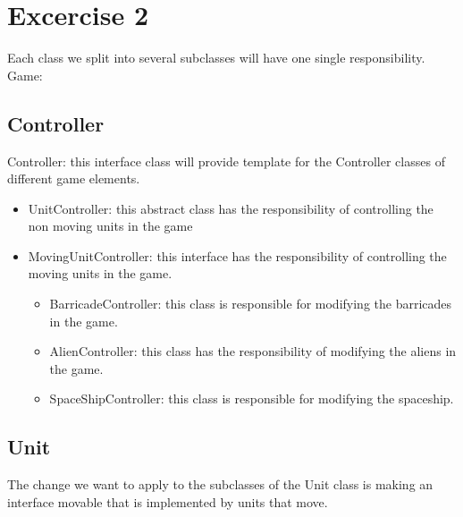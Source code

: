 \documentclass[10pt]{article}
\begin{document}
\section*{Excercise 2}
Each class we split into several subclasses will have one single responsibility. \\
Game:
\subsection*{Controller}
Controller: this interface class will provide template for the Controller classes of different game elements. 
	\begin{itemize}
	\item UnitController: this abstract class has the responsibility of controlling the non moving units in the game
	\item MovingUnitController: this interface has the responsibility of controlling the moving units in the game. 
		\begin{itemize}
			\item BarricadeController: this class is responsible for modifying the 	barricades in the game.
			\item AlienController: this class has the responsibility of modifying the aliens in the game.
			\item SpaceShipController: this class is responsible for modifying the spaceship.
		\end{itemize}
	\end{itemize}
\subsection*{Unit}
The change we want to apply to the subclasses of the Unit class is making an interface movable that is implemented by units that move.
\end{document}
